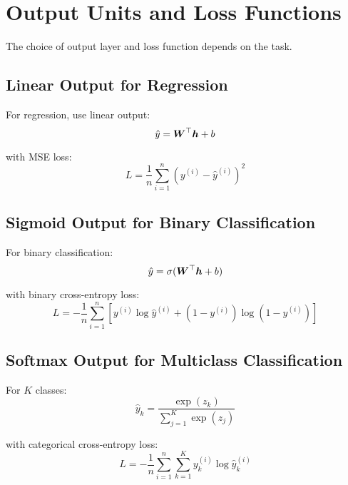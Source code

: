 
\section{Output Units and Loss Functions}
\label{sec:output-loss}

The choice of output layer and loss function depends on the task.

\subsection{Linear Output for Regression}

For regression, use linear output:
\begin{equation}
\hat{y} = \boldsymbol{W}^\top \boldsymbol{h} + b
\end{equation}

with MSE loss:
\begin{equation}
L = \frac{1}{n} \sum_{i=1}^{n} (y^{(i)} - \hat{y}^{(i)})^2
\end{equation}

\subsection{Sigmoid Output for Binary Classification}

For binary classification:
\begin{equation}
\hat{y} = \sigma(\boldsymbol{W}^\top \boldsymbol{h} + b)
\end{equation}

with binary cross-entropy loss:
\begin{equation}
L = -\frac{1}{n} \sum_{i=1}^{n} [y^{(i)} \log \hat{y}^{(i)} + (1-y^{(i)}) \log(1-\hat{y}^{(i)})]
\end{equation}

\subsection{Softmax Output for Multiclass Classification}

For $K$ classes:
\begin{equation}
\hat{y}_k = \frac{\exp(z_k)}{\sum_{j=1}^{K} \exp(z_j)}
\end{equation}

with categorical cross-entropy loss:
\begin{equation}
L = -\frac{1}{n} \sum_{i=1}^{n} \sum_{k=1}^{K} y_k^{(i)} \log \hat{y}_k^{(i)}
\end{equation}

